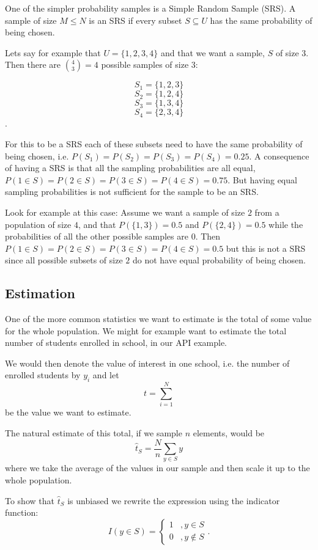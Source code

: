 \documentclass{article}
\begin{document}
One of the simpler probability samples is a Simple Random Sample (SRS). A
sample of size $M \leq N$ is an SRS if every subset $S \subseteq U$ has the same
probability of being chosen.

Lets say for example that $U = \{1, 2, 3, 4\}$ and that we want a sample, $S$ of
size $3$. Then there are $\binom{4}{3} = 4$  possible samples of size $3$:

$$ S_1 = \{1, 2, 3\} $$
$$ S_2 = \{1, 2, 4\} $$
$$ S_3 = \{1, 3, 4\} $$
$$ S_4 = \{2, 3, 4\} $$.

For this to be a SRS each of these subsets need to have the same probability of
being chosen, i.e. $P(S_1) = P(S_2) = P(S_3) = P(S_4) = 0.25$. A consequence of
having a SRS is that all the sampling probabilities are all equal, $P(1 \in S) =
P(2 \in S) = P(3 \in S) = P(4 \in S) = 0.75$. But having equal sampling
probabilities is not sufficient for the sample to be an SRS.

Look for example at this case:
Assume we want a sample of size $2$ from a population of size $4$, and that
$P(\{1, 3\}) = 0.5$ and $P(\{2, 4\}) = 0.5$ while the probabilities of all the
other possible samples are $0$. Then $P(1 \in S) = P(2 \in S) = P(3 \in S) = P(4 \in S) = 0.5$
but this is not a SRS since all possible subsets of size $2$ do not have equal
probability of being chosen.


\subsection{Estimation}

One of the more common statistics we want to estimate is the total of some value
for the whole population. We might for example want to estimate the total number
of students enrolled in school, in our API example.

We would then denote the value of interest in one school, i.e. the number of
enrolled students by $y_i$ and let
$$t = \sum_{i = 1}^{N}$$
be the value we want to estimate.

The natural estimate of this total, if we sample $n$ elements, would be
$$ \hat{t}_S = \frac{N}{n}\sum_{y \in S} y $$
where we take the average of the values in our sample and then scale it up to
the whole population.

To show that $\hat{t}_S$ is unbiased we rewrite the expression using the
indicator function:
$$ I(y \in S) =
\begin{cases}
  1 & , y \in S \\
  0 & , y \notin S
\end{cases} .$$
\end{document}
